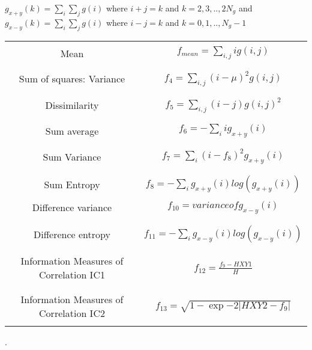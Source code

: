 $ g_{x+y}(k) = \sum_{i}\sum_{j}g(i) $ where $ i+j=k $ and $ k = 2, 3, .., 2N_{g} $ and $ g_{x-y}(k) =  \sum_{i}\sum_{j}g(i) $ where $ i-j=k $ and $ k = 0, 1, ..,N_{g}-1 $

\begin{table}
\begin{center}
\begin{tabular}{|c|c|}
\hline
& \\
Mean & $ f_{mean} = \sum_{i, j}i g(i, j) $ \\
& \\
\hline
& \\
Sum of squares: Variance & $ f_4 = \sum_{i, j}(i - \mu)^2 g(i, j) $ \\
& \\
\hline
& \\
Dissimilarity & $ f_5 = \sum_{i, j}(i - j) g(i, j)^2 $ \\
& \\
\hline
& \\
Sum average &  $ f_6 = -\sum_{i}i g_{x+y}(i) $ \\
& \\
\hline
& \\
Sum Variance & $ f_7 = \sum_{i}(i - f_8)^2 g_{x+y}(i) $ \\
& \\
\hline
& \\
Sum Entropy & $ f_8 = -\sum_{i}g_{x+y}(i) log (g_{x+y}(i)) $ \\
& \\
\hline
Difference variance & $ f_{10} = variance of g_{x-y}(i) $ \\
& \\
\hline
& \\
Difference entropy & $ f_{11} = -\sum_{i}g_{x-y}(i) log (g_{x-y}(i)) $ \\
& \\
\hline
& \\
Information Measures of Correlation IC1 & $ f_{12} = \frac{f_9 - HXY1}{H} $ \\
& \\
\hline
& \\
Information Measures of Correlation IC2 & $ f_{13} = \sqrt{1 - \exp{-2}|HXY2 - f_9|} $ \\
& \\
\hline
\end{tabular}
\end{center}
\label{tab:haralickAdvancedFeatures}
\end{table}.

